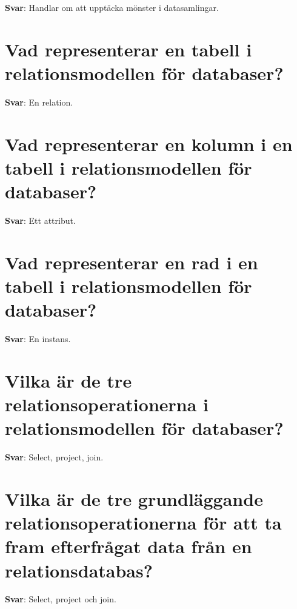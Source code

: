 \documentclass[a4paper,11pt,oneside]{book}
\begin{document}
\begin{sloppypar}
\label{q:292:sa:sv:True}

\textbf{Svar}: Handlar om att uppt\"acka m\"onster i datasamlingar.



\section{Vad representerar en tabell i relationsmodellen f\"or databaser?}

\label{q:293:sa:sv:True}

\textbf{Svar}: En relation.



\section{Vad representerar en kolumn i en tabell i relationsmodellen f\"or databaser?}

\label{q:294:sa:sv:True}

\textbf{Svar}: Ett attribut.



\section{Vad representerar en rad i en tabell i relationsmodellen f\"or databaser?}

\label{q:295:sa:sv:True}

\textbf{Svar}: En instans.



\section{Vilka \"ar de tre relationsoperationerna i relationsmodellen f\"or databaser?}

\label{q:296:sa:sv:True}

\textbf{Svar}: Select, project, join.



\section{Vilka \"ar de tre grundl\"aggande relationsoperationerna f\"or att ta fram efterfr\r{a}gat data fr\r{a}n en relationsdatabas?}

\label{q:297:sa:sv:True}

\textbf{Svar}: Select, project och join.




\end{sloppypar}
\end{document}
